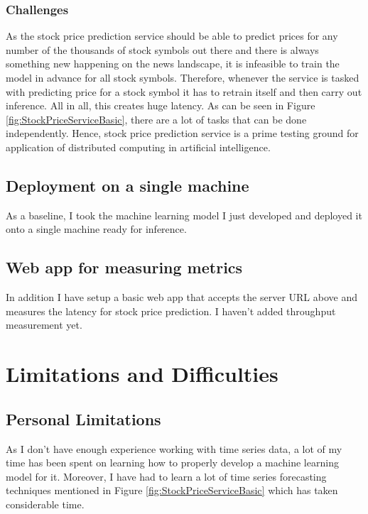\documentclass{report}
\begin{document}
\subsection{Challenges}

As the stock price prediction service should be able to predict prices for any number of the thousands of stock symbols out there and there is always something new happening on the news landscape, it is infeasible to train the model in advance for all stock symbols. Therefore, whenever the service is tasked with predicting price for a stock symbol it has to retrain itself and then carry out inference. All in all, this creates huge latency. As can be seen in Figure \ref{fig:StockPriceServiceBasic}, there are a lot of tasks that can be done independently. Hence, stock price prediction service is a prime testing ground for application of distributed computing in artificial intelligence.

\section{Deployment on a single machine}

As a baseline, I took the machine learning model I just developed and deployed it onto a single machine ready for inference.

\section{Web app for measuring metrics}

In addition I have setup a basic web app that accepts the server URL above and measures the latency for stock price prediction. I haven't added throughput measurement yet.

\chapter{Limitations and Difficulties}\label{chap:limitations}
\section{Personal Limitations}
As I don't have enough experience working with time series data, a lot of my time has been spent on learning how to properly develop a machine learning model for it. Moreover, I have had to learn a lot of time series forecasting techniques mentioned in Figure \ref{fig:StockPriceServiceBasic} which has taken considerable time.
\end{document}

